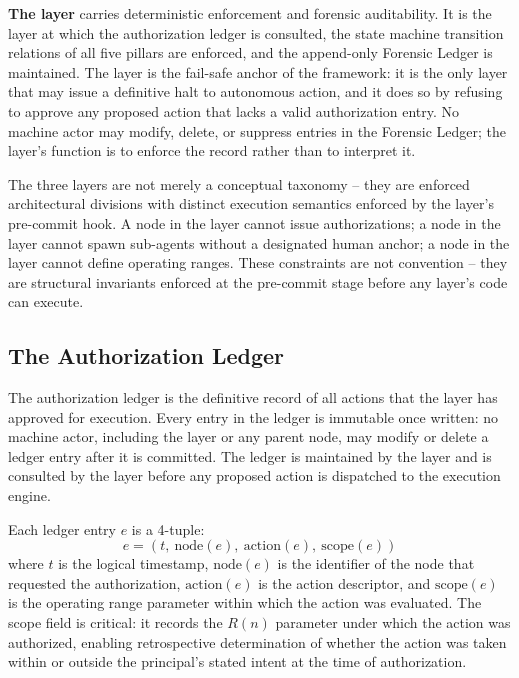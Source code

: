 \textbf{The \fact{} layer} carries deterministic enforcement and forensic
auditability.  It is the layer at which the authorization ledger is consulted,
the state machine transition relations of all five pillars are enforced, and
the append-only Forensic Ledger is maintained.  The \fact{} layer is the
fail-safe anchor of the framework: it is the only layer that may issue a
definitive halt to autonomous action, and it does so by refusing to approve
any proposed action that lacks a valid authorization entry.  No machine actor
may modify, delete, or suppress entries in the Forensic Ledger; the layer's
function is to enforce the record rather than to interpret it.

The three layers are not merely a conceptual taxonomy -- they are enforced
architectural divisions with distinct execution semantics enforced by the
\fact{} layer's pre-commit hook.  A node in the \bounds{} layer cannot issue
authorizations; a node in the \purpose{} layer cannot spawn sub-agents without
a designated human anchor; a node in the \fact{} layer cannot define operating
ranges.  These constraints are not convention -- they are structural invariants
enforced at the pre-commit stage before any layer's code can execute.

\subsection{The Authorization Ledger}\label{sec:auth-ledger}

The authorization ledger is the definitive record of all actions that the
\fact{} layer has approved for execution.  Every entry in the ledger is
immutable once written: no machine actor, including the \bounds{} layer or any
parent node, may modify or delete a ledger entry after it is committed.  The
ledger is maintained by the \fact{} layer and is consulted by the \bounds{}
layer before any proposed action is dispatched to the execution engine.

Each ledger entry $e$ is a 4-tuple:
\[
e = (t,\ \text{node}(e),\ \text{action}(e),\ \text{scope}(e))
\]
where $t$ is the logical timestamp, $\text{node}(e)$ is the identifier of
the node that requested the authorization, $\text{action}(e)$ is the action
descriptor, and $\text{scope}(e)$ is the operating range parameter within
which the action was evaluated.  The scope field is critical: it records the
$R(n)$ parameter under which the action was authorized, enabling retrospective
determination of whether the action was taken within or outside the principal's
stated intent at the time of authorization.


